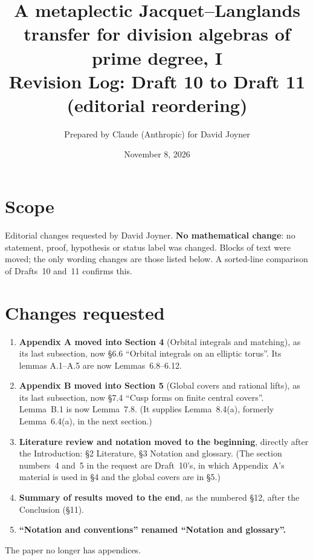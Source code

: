 \documentclass[11pt]{article}
\title{A metaplectic Jacquet--Langlands transfer for division algebras of prime degree, I\\
Revision Log: Draft 10 to Draft 11 (editorial reordering)}
\author{Prepared by Claude (Anthropic) for David Joyner}
\date{November 8, 2026}
\begin{document}
\maketitle

\section*{Scope}
Editorial changes requested by David Joyner.  \textbf{No mathematical
change}: no statement, proof, hypothesis or status label was changed.
Blocks of text were moved; the only wording changes are those listed
below.  A sorted-line comparison of Drafts~10 and~11 confirms this.

\section*{Changes requested}
\begin{enumerate}[leftmargin=*]
\item \textbf{Appendix A moved into Section 4} (Orbital integrals and
matching), as its last subsection, now \S6.6 ``Orbital integrals on an
elliptic torus''.  Its lemmas A.1--A.5 are now Lemmas~6.8--6.12.
\item \textbf{Appendix B moved into Section 5} (Global covers and
rational lifts), as its last subsection, now \S7.4 ``Cusp forms on
finite central covers''.  Lemma~B.1 is now Lemma~7.8.  (It supplies
Lemma~8.4(a), formerly Lemma~6.4(a), in the next section.)
\item \textbf{Literature review and notation moved to the beginning},
directly after the Introduction: \S2 Literature, \S3 Notation and
glossary.  (The section numbers~4 and~5 in the request are Draft~10's, in which
Appendix~A's material is used in \S4 and the global covers are in
\S5.)
\item \textbf{Summary of results moved to the end}, as the numbered
\S12, after the Conclusion (\S11).
\item \textbf{``Notation and conventions'' renamed ``Notation and
glossary''.}
\end{enumerate}
The paper no longer has appendices.
\end{document}
